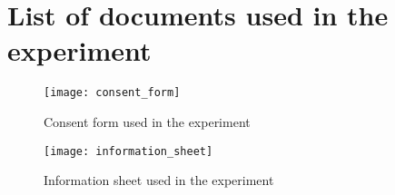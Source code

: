 

  \chapter{List of documents used in the experiment}

  \begin{figure}[h]
  \texttt{[image: consent\_form]}
  \caption{Consent form used in the experiment}
  \label{fig:consentForm}
  \end{figure}

  \begin{figure}[h]
  \texttt{[image: information\_sheet]}
  \caption{Information sheet used in the experiment}
  \label{fig:InformationSheet}
  \end{figure}
